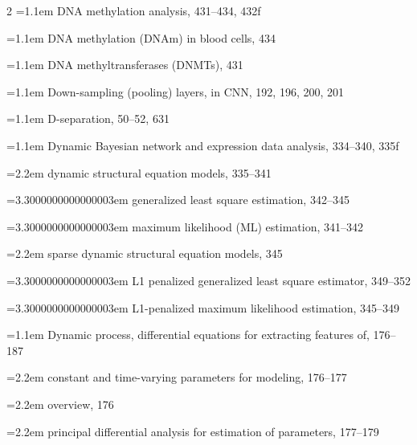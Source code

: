 \begin{multicols}{2}
\noindent\hangindent=1.1em DNA methylation analysis, 431--434, 432f\par
\noindent\hangindent=1.1em DNA methylation (DNAm) in blood cells, 434\par
\noindent\hangindent=1.1em DNA methyltransferases (DNMTs), 431\par
\noindent\hangindent=1.1em Down-sampling (pooling) layers, in CNN, 192, 196, 200, 201\par
\noindent\hangindent=1.1em D-separation, 50--52, 631\par
\noindent\hangindent=1.1em Dynamic Bayesian network and expression data analysis, 334--340, 335f\par
\noindent\hangindent=2.2em \hspace*{1.1em}dynamic structural equation models, 335--341\par
\noindent\hangindent=3.3000000000000003em \hspace*{2.2em}generalized least square estimation, 342--345\par
\noindent\hangindent=3.3000000000000003em \hspace*{2.2em}maximum likelihood (ML) estimation, 341--342\par
\noindent\hangindent=2.2em \hspace*{1.1em}sparse dynamic structural equation models, 345\par
\noindent\hangindent=3.3000000000000003em \hspace*{2.2em}L1 penalized generalized least square estimator, 349--352\par
\noindent\hangindent=3.3000000000000003em \hspace*{2.2em}L1-penalized maximum likelihood estimation, 345--349\par
\noindent\hangindent=1.1em Dynamic process, differential equations for extracting features of, 176--187\par
\noindent\hangindent=2.2em \hspace*{1.1em}constant and time-varying parameters for modeling, 176--177\par
\noindent\hangindent=2.2em \hspace*{1.1em}overview, 176\par
\noindent\hangindent=2.2em \hspace*{1.1em}principal differential analysis for estimation of parameters, 177--179\par

\end{multicols}
